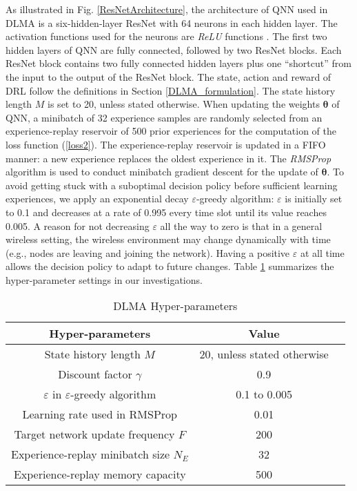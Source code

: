 \documentclass[journal,comsoc]{IEEEtran}
\begin{document}
As illustrated in Fig. \ref{ResNetArchitecture}, the architecture of QNN used in DLMA is a six-hidden-layer ResNet with 64 neurons in each hidden layer. The activation functions used for the neurons are \textit{ReLU} functions \cite{lecun2015deep}. The first two hidden layers of QNN are fully connected, followed by two ResNet blocks. Each ResNet block contains two fully connected hidden layers plus one ``shortcut'' from the input to the output of the ResNet block.  The state, action and reward of DRL follow the definitions in Section \ref{DLMA_formulation}. The state history length  $ M $ is set to 20, unless stated otherwise. When updating the weights  $ \bm{\theta} $ of QNN, a minibatch of 32 experience samples are randomly selected from an  experience-replay reservoir of 500 prior experiences for the computation of the loss function (\ref{loss2}). The experience-replay reservoir is updated in a FIFO manner: a new experience replaces the oldest experience in it.  The \textit{RMSProp} algorithm \cite{tieleman2012lecture} is used to conduct minibatch gradient descent for the update of $\bm{\theta} $.  To avoid getting stuck with a suboptimal decision policy before sufficient learning experiences,  we apply an exponential decay  $ \varepsilon $-greedy algorithm:  $ \varepsilon $ is initially set to 0.1 and decreases at a rate of 0.995 every time slot until its value reaches 0.005. A reason for not decreasing $ \varepsilon $  all the way to zero is that in a general wireless setting, the wireless environment may change dynamically with time (e.g., nodes are leaving and joining the network). Having a positive $ \varepsilon $ at all time allows the decision policy to adapt to future changes. Table \ref{tab:hyperparameters} summarizes the hyper-parameter settings in our investigations. 
\begin{table}[!htbp]
	\centering
	\caption{DLMA Hyper-parameters}\label{tab:hyperparameters}
	\vspace{0in}
	\begin{tabular}{ccc}
		\toprule
		Hyper-parameters& Value\\
		\midrule
		State history length  $ M $& 20, unless stated otherwise\\
		Discount factor $ \gamma $ & 0.9\\
		$ \varepsilon $ in $ \varepsilon $-greedy algorithm & 0.1 to 0.005\\
		Learning rate used in RMSProp & 0.01\\
		Target network update frequency $ F $ & 200\\
		Experience-replay minibatch size $ N_E $ & 32\\
		Experience-replay memory capacity & 500\\
		\bottomrule
	\end{tabular}
\end{table}
\end{document}
